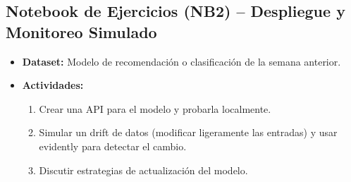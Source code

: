 \documentclass[12pt,a4paper]{article}
\begin{document}
\subsection*{Notebook de Ejercicios (NB2) – Despliegue y Monitoreo Simulado}
\begin{itemize}
    \item \textbf{Dataset:} Modelo de recomendación o clasificación de la semana anterior.
    \item \textbf{Actividades:}
    \begin{enumerate}
        \item Crear una API para el modelo y probarla localmente.
        \item Simular un drift de datos (modificar ligeramente las entradas) y usar evidently para detectar el cambio.
        \item Discutir estrategias de actualización del modelo.
    \end{enumerate}
\end{itemize}
\end{document}

